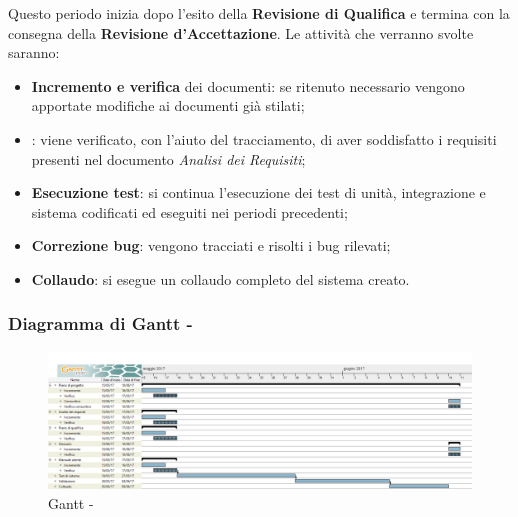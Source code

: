 \documentclass[./PianoDiProgetto.tex]{subfiles}
\begin{document}
  Questo periodo inizia dopo l'esito della \textbf{Revisione di Qualifica} e termina con la consegna della \textbf{Revisione d'Accettazione}. Le attività che verranno svolte saranno:
  \begin{itemize}
    \item \textbf{Incremento e verifica} dei documenti: se ritenuto necessario vengono apportate modifiche ai documenti già stilati;
    \item \textbf{}: viene verificato, con l'aiuto del tracciamento, di aver soddisfatto i requisiti presenti nel documento \textit{Analisi dei Requisiti};
    \item \textbf{Esecuzione test}: si continua l'esecuzione dei test di unità, integrazione e sistema codificati ed eseguiti nei periodi precedenti;
    \item \textbf{Correzione bug}: vengono tracciati e risolti i bug rilevati;
    \item \textbf{Collaudo}: si esegue un collaudo completo del sistema creato.
  \end{itemize}

 \newpage
  \subsubsection{Diagramma di Gantt - \PerV}
    \begin{figure}[!h]
    \centering
    \includegraphics[width=\textwidth]{images/V}
    \caption{Gantt - \PerV}
    \end{figure}
\end{document}
